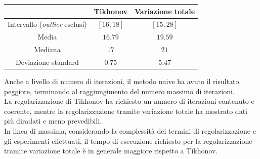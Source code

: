 \documentclass[11pt]{article}
\begin{document}
\begin{center}
    \begin{tabular}{ |c|c|c| }
    \hline
    & Tikhonov & Variazione totale \\ 
    \hline
    Intervallo (\emph{outlier} esclusi) & $[16, 18]$ & $[15, 28]$ \\
    Media & $16.79$ & $19.59$ \\
    Mediana & $17$ & $21$ \\
    Deviazione standard & $0.75$ & $5.47$ \\
    \hline
    \end{tabular}
\end{center}
Anche a livello di numero di iterazioni, il metodo naive ha avuto il risultato peggiore, terminando al raggiungimento del numero massimo di iterazioni.\\
La regolarizzazione di Tikhonov ha richiesto un numero di iterazioni contenuto e coerente, mentre la regolarizzazione tramite variazione totale ha mostrato dati più diradati e meno prevedibili.\\
In linea di massima, considerando la complessità dei termini di regolarizzazione e gli esperimenti effettuati, il tempo di esecuzione richiesto per la regolarizzazione tramite variazione totale è in generale maggiore rispetto a Tikhonov.
\end{document}
